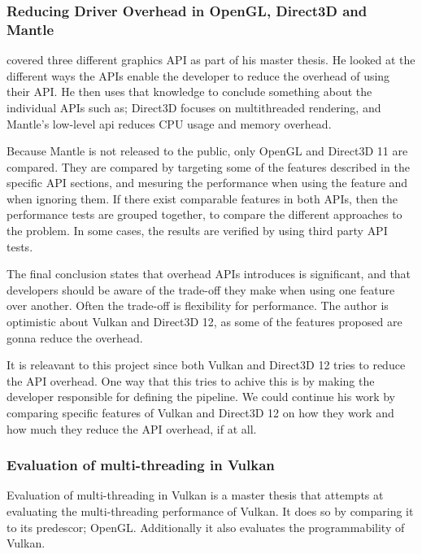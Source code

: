 \subsubsection{Reducing Driver Overhead in OpenGL, Direct3D and Mantle}

\citet{dobersberger_2015_reducing} covered three different graphics \gls{API} as part of his master thesis. 
He looked at the different ways the \glspl{API} enable the developer to reduce the overhead of using their \gls{API}. 
He then uses that knowledge to conclude something about the individual \glspl{API} such as; Direct3D focuses on multithreaded rendering, and Mantle's low-level api reduces \gls{CPU} usage and memory overhead.

Because Mantle is not released to the public, only OpenGL and Direct3D 11 are compared.
They are compared by targeting some of the features described in the specific \gls{API} sections, and mesuring the performance when using the feature and when ignoring them.
If there exist comparable features in both \glspl{API}, then the performance tests are grouped together, to compare the different approaches to the problem.
In some cases, the results are verified by using third party \gls{API} tests.

The final conclusion states that overhead \glspl{API} introduces is significant, and that developers should be aware of the trade-off they make when using one feature over another.
Often the trade-off is flexibility for performance.
The author is optimistic about Vulkan and Direct3D 12, as some of the features proposed are gonna reduce the overhead.

It is releavant to this project  since both Vulkan and Direct3D 12 tries to reduce the \gls{API} overhead.
One way that this tries to achive this is by making the developer responsible for defining the pipeline.
We could continue his work by comparing specific features of Vulkan and Direct3D 12 on how they work and how much they reduce the \gls{API} overhead, if at all.

\subsubsection{Evaluation of multi-threading in Vulkan}

Evaluation of multi-threading in Vulkan \cite{blackert_2016_evaluation} is a master thesis that attempts at evaluating the multi-threading performance of Vulkan. It does so by comparing it to its predescor; OpenGL. 
Additionally it also evaluates the programmability of Vulkan. 

